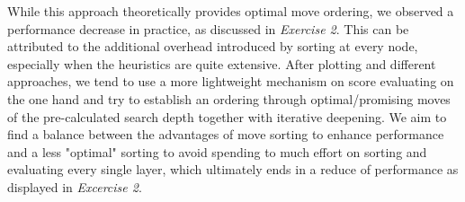 \noindent While this approach theoretically provides optimal move ordering, we observed a performance decrease in practice, as discussed in \textit{Exercise 2}. This can be attributed to the additional overhead introduced by sorting at every node, especially when the heuristics are quite extensive. After plotting and different approaches, we tend to use a more lightweight mechanism on score evaluating on the one hand and try to establish an ordering through optimal/promising moves of the pre-calculated search depth together with iterative deepening. We aim to find a balance between the advantages of move sorting to enhance performance and a less "optimal" sorting to avoid spending to much effort on sorting and evaluating every single layer, which ultimately ends in a reduce of performance as displayed in \textit{Excercise 2}. 

